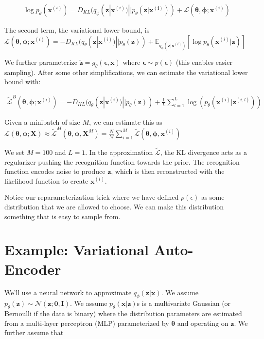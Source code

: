 \documentclass[a4paper]{article}
\begin{document}
\begin{align}
  \log{p_{\theta}(\bm{x}^{(i)})} = D_{KL}(q_{\phi}(\bm{z} | \bm{x}^{(i)})
  || p_{\theta}(\bm{z} | \bm{x^{(i)}})) + \mathcal{L}(\bm{\theta}, \bm{\phi};
  \bm{x}^{(i)})
\end{align}

The second term, the variational lower bound, is $\mathcal{L}(\bm{\theta},
\bm{\phi}; \bm{x}^{(i)}) = -D_{KL}(q_{\theta}(\bm{z} | \bm{x}^{(i)}) ||
p_{\theta}(\bm{z})) + \mathbb{E}_{q_{\phi}(\bm{z} | \bm{x}^{(i)})}[
  \log{p_{\theta}(\bm{x}^{(i)} | \bm{z})}
]$

We further parameterize $\tilde{\bm{z}} = g_{\theta}(\bm{\epsilon}, \bm{x})$
where $\bm{\epsilon} \sim p(\bm{\epsilon})$ (this enables easier sampling).
After some other simplifications, we can estimate the variational lower bound
with:

\begin{align}
  \tilde{\mathcal{L}}^B(\bm{\theta}, \bm{\phi}; \bm{x}^{(i)})
  = -D_{KL}(
    q_{\theta}(\bm{z} | \bm{x}^{(i)})
    || p_{\theta}(\bm{z})
  ) + \frac{1}{L} \sum_{l=1}^{L}{\log(p_{\theta}(
    \bm{x}^{(i)} | \bm{z}^{(i, l)}
  ))}
\end{align}

Given a minibatch of size $M$, we can estimate this as $\mathcal{L}(
\bm{\theta}, \bm{\phi}; \bm{X}) \approx \tilde{\mathcal{L}}^M(\bm{\theta},
\bm{\phi}, \bm{X}^{M}) = \frac{N}{M} \sum_{i=1}^{M}{\tilde{\mathcal{L}}(
  \bm{\theta}, \bm{\phi}, \bm{x}^{(i)}
)}$

We set $M = 100$ and $L = 1$. In the approximation $\tilde{\mathcal{L}}$,
the KL divergence acts as a regularizer pushing the recognition function towards
the prior. The recognition function encodes noise to produce $\bm{z}$, which is
then reconstructed with the likelihood function to create $\bm{x}^{(i)}$.

Notice our reparameterization trick where we have defined $p(\epsilon)$ as
some distribution that we are allowed to choose. We can make this distribution
something that is easy to sample from.

\section{Example: Variational Auto-Encoder}
We'll use a neural network to approximate $q_{\phi}(\bm{z} | \bm{x})$.
We assume $p_\theta(\bm{z}) \sim \mathcal{N}(\bm{z}; \bm{0}, \bm{I})$. We
assume $p_{\theta}(\bm{x} | \bm{z})$s is a multivariate Gaussian (or 
Bernoulli if the data is binary) where the distribution parameters are estimated
from a multi-layer perceptron (MLP) parameterized by $\bm{\theta}$ and operating
on $\bm{z}$. We further assume that
\end{document}
